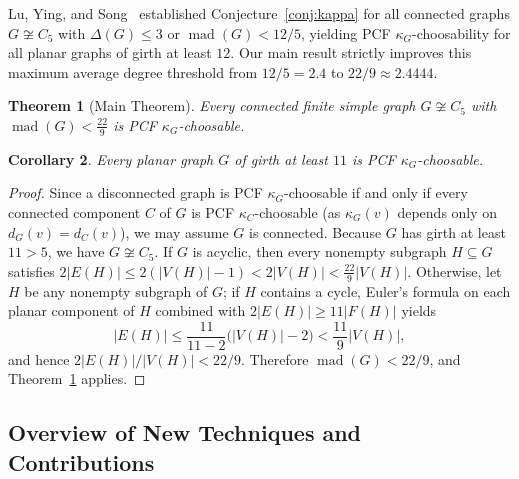 \documentclass[11pt,a4paper]{article}
\newtheorem{theorem}{Theorem}[section]
\newtheorem{corollary}[theorem]{Corollary}
\theoremstyle{definition}
\newcommand{\mad}{\operatorname{mad}}
\begin{document}
Lu, Ying, and Song~\cite{LuYingSong2026} established Conjecture~\ref{conj:kappa} for all connected graphs $G \not\cong C_5$ with $\Delta(G) \le 3$ or $\mad(G) < 12/5$, yielding PCF $\kappa_G$-choosability for all planar graphs of girth at least $12$. Our main result strictly improves this maximum average degree threshold from $12/5 = 2.4$ to $22/9 \approx 2.4444$.

\begin{theorem}[Main Theorem]\label{thm:main}
Every connected finite simple graph $G \not\cong C_5$ with $\mad(G) < \frac{22}{9}$ is PCF $\kappa_G$-choosable.
\end{theorem}

\begin{corollary}\label{cor:planar}
Every planar graph $G$ of girth at least $11$ is PCF $\kappa_G$-choosable.
\end{corollary}

\begin{proof}
Since a disconnected graph is PCF $\kappa_G$-choosable if and only if every connected component $C$ of $G$ is PCF $\kappa_C$-choosable (as $\kappa_G(v)$ depends only on $d_G(v) = d_C(v)$), we may assume $G$ is connected. Because $G$ has girth at least $11 > 5$, we have $G \not\cong C_5$. If $G$ is acyclic, then every nonempty subgraph $H \subseteq G$ satisfies $2|E(H)| \le 2(|V(H)|-1) < 2|V(H)| < \frac{22}{9}|V(H)|$. Otherwise, let $H$ be any nonempty subgraph of $G$; if $H$ contains a cycle, Euler's formula on each planar component of $H$ combined with $2|E(H)| \ge 11|F(H)|$ yields
\[
  |E(H)| \le \frac{11}{11 - 2}\bigl(|V(H)| - 2\bigr) < \frac{11}{9}|V(H)|,
\]
and hence $2|E(H)|/|V(H)| < 22/9$. Therefore $\mad(G) < 22/9$, and Theorem~\ref{thm:main} applies.
\end{proof}

\subsection*{Overview of New Techniques and Contributions}
\end{document}
